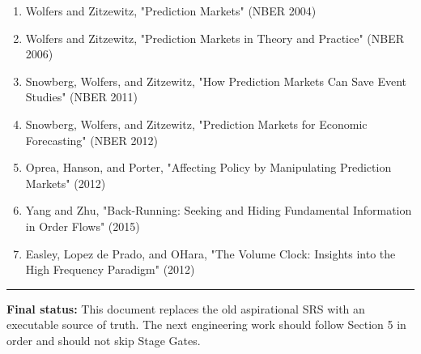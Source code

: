 \documentclass[
]{article}
\providecommand{\tightlist}{%
  \setlength{\itemsep}{0pt}\setlength{\parskip}{0pt}}
\begin{document}
\begin{enumerate}
\def\labelenumi{\arabic{enumi}.}
\tightlist
\item
  Wolfers and Zitzewitz, "Prediction Markets" (NBER 2004)
\item
  Wolfers and Zitzewitz, "Prediction Markets in Theory and Practice"
  (NBER 2006)
\item
  Snowberg, Wolfers, and Zitzewitz, "How Prediction Markets Can Save
  Event Studies" (NBER 2011)
\item
  Snowberg, Wolfers, and Zitzewitz, "Prediction Markets for Economic
  Forecasting" (NBER 2012)
\item
  Oprea, Hanson, and Porter, "Affecting Policy by Manipulating
  Prediction Markets" (2012)
\item
  Yang and Zhu, "Back-Running: Seeking and Hiding Fundamental
  Information in Order Flows" (2015)
\item
  Easley, Lopez de Prado, and O\textquotesingle Hara, "The Volume Clock:
  Insights into the High Frequency Paradigm" (2012)
\end{enumerate}

\begin{center}\rule{0.5\linewidth}{0.5pt}\end{center}

\textbf{Final status:} This document replaces the old aspirational SRS
with an executable source of truth. The next engineering work should
follow Section 5 in order and should not skip Stage Gates.
\end{document}
